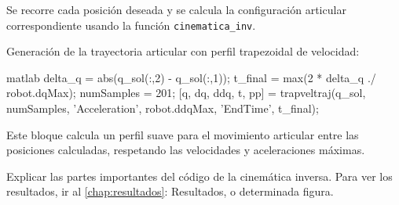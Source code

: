 Se recorre cada posición deseada y se calcula la configuración articular correspondiente usando la función \texttt{cinematica\_inv}.

\bigskip

Generación de la trayectoria articular con perfil trapezoidal de velocidad:

\begin{matlabcode}{matlab}
	delta_q = abs(q_sol(:,2) - q_sol(:,1));
	t_final = max(2 * delta_q ./ robot.dqMax);
	numSamples = 201;
	[q, dq, ddq, t, pp] = trapveltraj(q_sol, numSamples, 'Acceleration', robot.ddqMax, 'EndTime', t_final);
\end{matlabcode}

Este bloque calcula un perfil suave para el movimiento articular entre las posiciones calculadas, respetando las velocidades y aceleraciones máximas.

\bigskip

Explicar las partes importantes del código de la cinemática inversa.
Para ver los resultados, ir al \autoref{chap:resultados}: Resultados, o determinada figura.